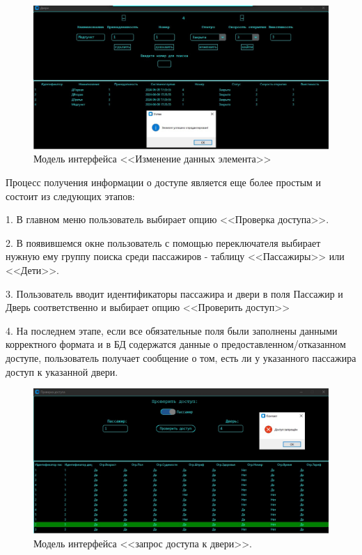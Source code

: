\begin{figure} [ht]
	\centering
	\includegraphics[width=1.05\linewidth]{images/Example1}
	\caption{Модель интерфейса <<Изменение данных элемента>>}
	\label{fig:example1}
\end{figure}
Процесс получения информации о доступе является еще более простым и состоит из следующих этапов:

1. В главном меню пользователь выбирает опцию <<Проверка доступа>>.

2. В появившемся окне пользователь с помощью переключателя выбирает нужную ему группу поиска среди пассажиров - таблицу <<Пассажиры>> или <<Дети>>.

3. Пользователь вводит идентификаторы пассажира и двери в поля \textquotedbl Пассажир \textquotedbl и \textquotedbl Дверь \textquotedbl соответственно и выбирает опцию <<Проверить доступ>>

4. На последнем этапе, если все обязательные поля были заполнены данными корректного формата и в БД содержатся данные о предоставленном/отказанном доступе, пользователь получает сообщение о том, есть ли у указанного пассажира доступ к указанной двери.

\begin{figure} [H]
	\centering
	\includegraphics[width=1.05\linewidth]{images/Example3}
	\caption{Модель интерфейса <<запрос доступа к двери>>.}
	\label{fig:example3}
\end{figure}


